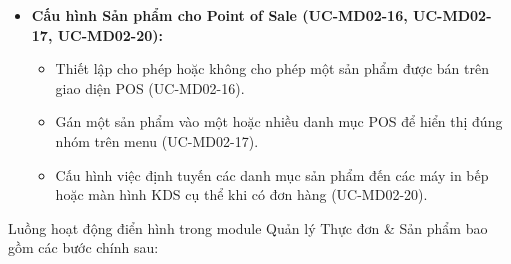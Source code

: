 \begin{itemize}
    \item \textbf{Cấu hình Sản phẩm cho Point of Sale (UC-MD02-16, UC-MD02-17, UC-MD02-20):}
    \begin{itemize}
        \item Thiết lập cho phép hoặc không cho phép một sản phẩm được bán trên giao diện POS (UC-MD02-16).
        \item Gán một sản phẩm vào một hoặc nhiều danh mục POS để hiển thị đúng nhóm trên menu (UC-MD02-17).
        \item Cấu hình việc định tuyến các danh mục sản phẩm đến các máy in bếp hoặc màn hình KDS cụ thể khi có đơn hàng (UC-MD02-20).
    \end{itemize}
\end{itemize}

\label{sssec:md02_overall_workflow}
Luồng hoạt động điển hình trong module Quản lý Thực đơn \& Sản phẩm bao gồm các bước chính sau:
